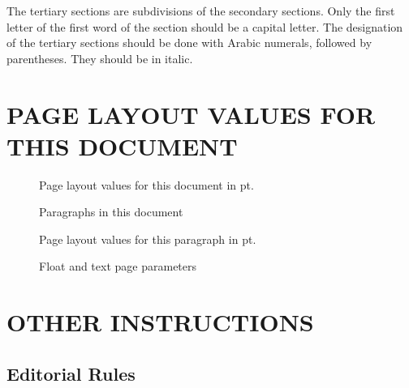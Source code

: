 \documentclass[english]{cobep-spec}
\begin{document}
The tertiary sections are subdivisions of the secondary sections. Only the first letter of the first word of the section should be a capital letter. The designation of the tertiary sections should be done with Arabic numerals, followed by parentheses. They should be in italic.


\section{PAGE LAYOUT VALUES FOR THIS DOCUMENT}

\begin{figure}[!ht]
	\caption{Page layout values for this document in pt.} \label{fig:pagevalues}
\drawdimensionstrue
{}
\pagediagram
\pagevalues

\vspace{10pt}
\paragraphvalues

\currentpage
\end{figure}

\currentparagraph
\begin{figure}[!ht]
	
	\drawdimensionstrue
	\paragraphdesign
	\caption{Paragraphs in this document}\label{fig:dpara}
\end{figure}

\begin{figure}[!ht]
	

	\paragraphvalues
	\caption{Page layout values for this paragraph in pt.} \label{fig:paragraphvalues}
	
	\currentpage
\end{figure}


\begin{figure}
	\floatpagevalues
	\caption{Float and text page parameters}\label{fig:fpp2}
\end{figure}

\section{OTHER INSTRUCTIONS}

\subsection{Editorial Rules}
\end{document}
